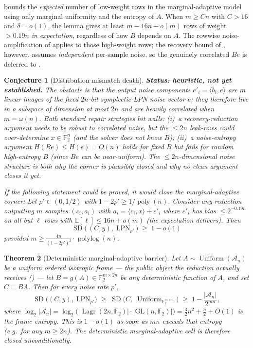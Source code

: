 \documentclass[11pt,a4paper]{article}
\theoremstyle{plain}
\newtheorem{theorem}{Theorem}[section]
\newtheorem{conjecture}[theorem]{Conjecture}
\theoremstyle{definition}
\newcommand{\F}{\mathbb{F}}
\DeclareMathOperator{\Lagr}{Lagr}
\begin{document}
 bounds the \emph{expected} number of low-weight rows in the marginal-adaptive model using only marginal uniformity and the entropy of $A$.  When $m\ge Cn$ with $C>16$ and $\delta=o(1)$, the lemma gives at least $m-16n-o(m)$ rows of weight $>0.19n$ \emph{in expectation}, regardless of how $B$ depends on $A$.  The rowwise noise-amplification of  applies to those high-weight rows; the recovery bound of , however, assumes \emph{independent} per-sample noise, so the genuinely correlated $Be$ is deferred to .

\begin{conjecture}[Distribution-mismatch death]
\label{lem:m2}
\textbf{Status: heuristic, not yet established.}  The obstacle is that the output noise components $e'_i=\langle b_i,e\rangle$ are $m$ linear images of the fixed $2n$-bit symplectic-LPN noise vector $e$; they therefore live in a subspace of dimension at most $2n$ and are heavily correlated when $m=\omega(n)$.  Both standard repair strategies hit walls: (i)~a recovery-reduction argument needs  to be robust to correlated noise, but the $\le 2n$ leak-rows could over-determine $x\in\F_2^{n}$ (and the solver does not know $B$); (ii)~a noise-entropy argument $H(Be)\le H(e)=O(n)$ holds for fixed $B$ but fails for random high-entropy $B$ (since $Be$ can be near-uniform).  The $\le 2n$-dimensional noise structure is both why the corner is plausibly closed and why no clean argument closes it yet.

\emph{If} the following statement could be proved, it would close the marginal-adaptive corner: Let $p'\in(0,1/2)$ with $1-2p'\ge 1/\operatorname{poly}(n)$.  Consider any reduction outputting $m$ samples $(c_i,a_i)$ with $a_i=\langle c_i,x\rangle+e'_i$ where $e'_i$ has bias $\le 2^{-0.19n}$ on all but $\ell$ rows with $\mathbb E[\ell]\le 16n+o(m)$ (the expectation  delivers).  Then
\[
\operatorname{SD}\bigl(\,(C,y),\;\mathrm{LPN}_{p'}\,\bigr)
\;\ge\;
1-o(1)
\]
provided $m\ge \frac{4n}{(1-2p')^{2}}\cdot\operatorname{polylog}(n)$.
\end{conjecture}

\begin{theorem}[Deterministic marginal-adaptive barrier]
\label{thm:deterministic-marginal-adaptive}
Let $A\sim\operatorname{Uniform}(\mathcal{A}_n)$ be a uniform ordered isotropic frame --- the public object the reduction actually receives () --- let $B=g(A)\in\F_2^{m\times 2n}$ be any \emph{deterministic} function of $A$, and set $C=BA$. Then for every noise rate $p'$,
\[
\operatorname{SD}\bigl((C,y),\;\mathrm{LPN}_{p'}\bigr)
\;\ge\;
\operatorname{SD}\bigl(C,\;\operatorname{Uniform}_{\F_2^{m\times n}}\bigr)
\;\ge\;
1-\frac{|\mathcal{A}_n|}{2^{mn}},
\]
where $\log_2|\mathcal{A}_n|=\log_2\!\bigl(|\Lagr(2n,\F_2)|\cdot|\mathrm{GL}(n,\F_2)|\bigr)=\tfrac32 n^2+\tfrac n2+O(1)$ is the frame entropy. This is $1-o(1)$ as soon as $mn$ exceeds that entropy (e.g.\ for any $m\ge 2n$). The deterministic marginal-adaptive cell is therefore closed unconditionally.
\end{theorem}
\end{document}
